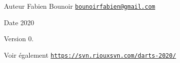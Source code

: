 \begin{DoxyAuthor}{Auteur}
Fabien Bounoir \href{mailto:bounoirfabien@gmail.com}{\tt bounoirfabien@gmail.\+com} 
\end{DoxyAuthor}
\begin{DoxyDate}{Date}
2020 
\end{DoxyDate}
\begin{DoxyVersion}{Version}
0. 
\end{DoxyVersion}
\begin{DoxySeeAlso}{Voir également}
\href{https://svn.riouxsvn.com/darts-2020/}{\tt https\+://svn.\+riouxsvn.\+com/darts-\/2020/} 
\end{DoxySeeAlso}
